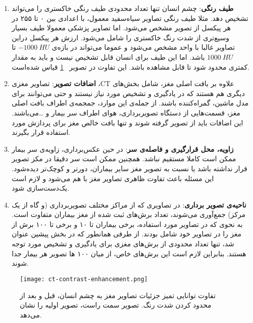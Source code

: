 \begin{enumerate}
        \item \textbf{طیف رنگی}:  چشم انسان تنها تعداد محدودی طیف رنگی خاکستری را می‌تواند تشخیص دهد. مثلا طیف رنگی تصاویر سیاه‌سفید معمول، با اعدادی بین ۰ تا ۲۵۵ در هر پیکسل از تصویر مشخص می‌شود.
        اما تصاویر پزشکی معمولا طیف بسیار وسیع‌تری از شدت رنگ خاکستری را شامل می‌شود. 
        ارزش هر پیکسل دراین تصاویر غالبا با واحد  مشخص می‌شود و عموما می‌تواند در بازه‌ی $-1000\ HU$ تا $1000\ HU$ باشد.
        اما این طیف برای انسان قابل تشخیص نیست و باید به مقدار کمتری محدود شود تا قابل مشاهده باشد. این تفاوت در تصویر ~\ref{fig:ct-contrast-enhancement} 
        قیاس شده‌است.
        \item \textbf{اضافات تصویر}: تصاویر مغزی ،CT علاوه بر بافت اصلی مغز، شامل بخش‌های دیگری هم هستند که در یادگیری و تشخیص مورد نیاز نیستند و حتی می‌توانند برای مدل ماشین، گمراه‌کننده باشند.
        از جمله‌ی این موارد، جمجمه‌ی اطراف بافت اصلی مغز، قسمت‌هایی از دستگاه تصویربرداری، هوای اطراف سر بیمار و \dots می‌باشند.
        این اضافات باید از تصویر گرفته شوند و تنها بافت خالص مغز برای پردازش مورد استفاده قرار بگیرند.
        \item \textbf{زاویه، محل قرار‌گیری و فاصله‌ی سر}: در حین عکس‌برداری، زاویه‌ی سر بیمار ممکن است کاملا مستقیم نباشد.
        همچنین ممکن است سر دقیقا در مکز تصویر قرار نداشته باشد یا نسبت به تصویر مغز سایر بیماران، دورتر و کوچک‌تر دیده‌شود.
        این مسئله باعث تفاوت ظاهری تصاویر مغز با هم می‌شود و لازم است یک‌دست‌سازی شود.
        \item \textbf{ناحیه‌ی تصویر برداری}: در تصاویری که از مراکز مختلف تصویربرداری (و گاه از یک مرکز) جمع‌آوری می‌شوند، 
        تعداد برش‌های ثبت شده از مغز بیماران متفاوت است.
        به نحوی که در تصاویر مورد استفاده، برخی بیماران تا ۱۰ و برخی تا ۱۰۰ برش از مغز را در تصاویر خود شامل بودند.
        از طرفی همانطور که در بخش پیشین عنوان شد، تنها تعداد محدودی از برش‌های مغزی برای یادگیری و تشخیص مورد توجه هستند.
        بنابراین لازم است این برش‌های خاص، از میان ۱۰۰ ها تصویر هر بیمار جدا شوند. 
\end{enumerate}

\begin{figure}[ht]
\centering
\texttt{[image: ct-contrast-enhancement.png]}
\caption[]{تفاوت توانایی تمیز جزئیات تصاویر مغز به چشم انسان، قبل و بعد از محدود کردن شدت رنگ. تصویر سمت راست، تصویر اولیه را نشان می‌دهد.}
\label{fig:ct-contrast-enhancement}
\end{figure}

